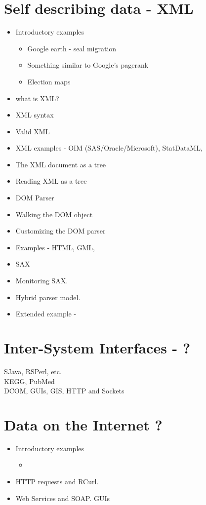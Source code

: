 \documentclass[11pt,timesroman]{article}
\begin{document}
\section{Self describing data - XML}
        \begin{itemize}
        \item Introductory examples
          \begin{itemize}
            \item Google earth - seal migration
            \item Something similar to Google's pagerank
            \item Election maps
          \end{itemize}
        \item what is XML?
        \item XML syntax
        \item Valid XML 
        \item XML examples - OIM (SAS/Oracle/Microsoft), StatDataML, 
        \item The XML document as a tree
        \item Reading XML as a tree
        \item DOM Parser
        \item Walking the DOM object
        \item Customizing the DOM parser
        \item Examples - HTML, GML, 
        \item SAX
        \item Monitoring SAX.
        \item Hybrid parser model. 
        \item Extended example - 
        \end{itemize}


\section{Inter-System Interfaces - ?}
SJava, RSPerl, etc.
\\
KEGG, PubMed
\\
DCOM, GUIs, GIS, HTTP and Sockets


\section{Data on the Internet ?}
  \begin{itemize}
  \item Introductory examples
    \begin{itemize}
      \item
    \end{itemize}
  \item HTTP requests and RCurl.
  \item Web Services and SOAP.
      GUIs 
  \end{itemize}
\end{document}
